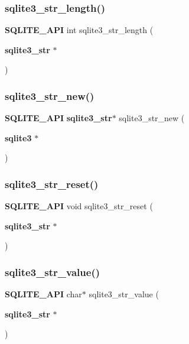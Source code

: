 \mbox{\label{sqlite3_8h_a25f7af015d2761cd82cb00cbb3060726}} 
\subsubsection{sqlite3\_str\_length()}
{\footnotesize\ttfamily \textbf{ S\+Q\+L\+I\+T\+E\+\_\+\+A\+PI} int sqlite3\+\_\+str\+\_\+length (\begin{DoxyParamCaption}\item[{\textbf{ sqlite3\+\_\+str} $\ast$}]{ }\end{DoxyParamCaption})}

\mbox{\label{sqlite3_8h_a0a2b07db0c726f4176f602d6fac2f756}} 
\subsubsection{sqlite3\_str\_new()}
{\footnotesize\ttfamily \textbf{ S\+Q\+L\+I\+T\+E\+\_\+\+A\+PI} \textbf{ sqlite3\+\_\+str}$\ast$ sqlite3\+\_\+str\+\_\+new (\begin{DoxyParamCaption}\item[{\textbf{ sqlite3} $\ast$}]{ }\end{DoxyParamCaption})}

\mbox{\label{sqlite3_8h_ab9e9d3dc2dd748199ab1439b90a30905}} 
\subsubsection{sqlite3\_str\_reset()}
{\footnotesize\ttfamily \textbf{ S\+Q\+L\+I\+T\+E\+\_\+\+A\+PI} void sqlite3\+\_\+str\+\_\+reset (\begin{DoxyParamCaption}\item[{\textbf{ sqlite3\+\_\+str} $\ast$}]{ }\end{DoxyParamCaption})}

\mbox{\label{sqlite3_8h_aff9d11a6ad17fc26b19233a2651daef6}} 
\subsubsection{sqlite3\_str\_value()}
{\footnotesize\ttfamily \textbf{ S\+Q\+L\+I\+T\+E\+\_\+\+A\+PI} char$\ast$ sqlite3\+\_\+str\+\_\+value (\begin{DoxyParamCaption}\item[{\textbf{ sqlite3\+\_\+str} $\ast$}]{ }\end{DoxyParamCaption})}

